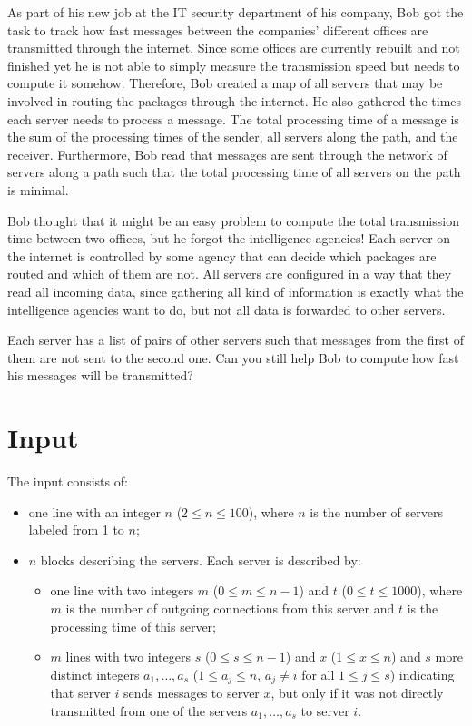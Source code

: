 
As part of his new job at the IT security department of his
company, Bob got the task to track how fast messages between the companies'
different offices are transmitted through the internet.  Since some offices
are currently rebuilt and not finished yet he is not able to simply measure
the transmission speed but needs to compute it somehow.  Therefore, Bob
created a map of all servers that may be involved in routing the packages
through the internet.  He also gathered the times each server needs to
process a message.  The total processing time of a message is the sum of the
processing times of the sender, all servers along the path, and the
receiver.  Furthermore, Bob read that messages are sent through the network
of servers along a path such that the total processing time of all servers
on the path is minimal.

Bob thought that it might be an easy problem to compute the total
transmission time between two offices, but he forgot the intelligence
agencies!  Each server on the internet is controlled by some agency that can
decide which packages are routed and which of them are not.  All servers are
configured in a way that they read all incoming data, since gathering all
kind of information is exactly what the intelligence agencies want to do,
but not all data is forwarded to other servers.

Each server has a list of pairs of other servers such that messages from the
first of them are not sent to the second one.  Can you still help Bob to
compute how fast his messages will be transmitted?

\section*{Input}

The input consists of:
\begin{itemize}
\item one line with an integer $n$ ($2 \leq n \leq 100$), where $n$ is the number of servers labeled from 1 to $n$;
\item $n$ blocks describing the servers. Each server is described by:
\begin{itemize}
\item one line with two integers $m$ ($0 \leq m \le n-1$) and $t$ ($0 \leq t \leq 1000$), where $m$ is the number of outgoing connections from this server and $t$ is the processing time of this server;
\item $m$ lines with two integers $s$ ($0 \leq s \le n-1$) and $x$ ($1 \leq x \leq n$) and $s$ more distinct integers $a_1, \ldots, a_s$ ($1 \leq a_j \leq n$, $a_j \neq i$ for all $1 \leq j \leq s$) indicating that server $i$ sends messages to server $x$, but only if it was not directly transmitted from one of the servers $a_1, \ldots, a_s$ to server $i$.
\end{itemize}
\end{itemize}

